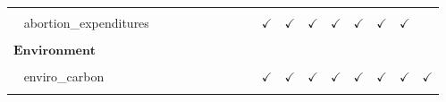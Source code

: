 \documentclass[
  12pt]{article}
\begin{document}
\begin{table}[H]
{\begin{tabular}{lcccccccccccccccc}
\cellcolor{gray!6}{$\hspace{10pt}$abortion\_coverage} & \cellcolor{gray!6}{} & \cellcolor{gray!6}{} & \cellcolor{gray!6}{} & \cellcolor{gray!6}{} & \cellcolor{gray!6}{} & \cellcolor{gray!6}{} & \cellcolor{gray!6}{} & \cellcolor{gray!6}{} & \cellcolor{gray!6}{$\checkmark$} & \cellcolor{gray!6}{$\checkmark$} & \cellcolor{gray!6}{$\checkmark$} & \cellcolor{gray!6}{$\checkmark$} & \cellcolor{gray!6}{$\checkmark$} & \cellcolor{gray!6}{} & \cellcolor{gray!6}{$\checkmark$} & \cellcolor{gray!6}{}\\
$\hspace{10pt}$abortion\_expenditures &  &  &  &  &  &  &  &  & $\checkmark$ & $\checkmark$ & $\checkmark$ & $\checkmark$ & $\checkmark$ & $\checkmark$ & $\checkmark$ & \\
\cellcolor{gray!6}{$\hspace{10pt}$abortion\_prohibition} & \cellcolor{gray!6}{} & \cellcolor{gray!6}{} & \cellcolor{gray!6}{} & \cellcolor{gray!6}{} & \cellcolor{gray!6}{} & \cellcolor{gray!6}{} & \cellcolor{gray!6}{} & \cellcolor{gray!6}{} & \cellcolor{gray!6}{} & \cellcolor{gray!6}{$\checkmark$} & \cellcolor{gray!6}{$\checkmark$} & \cellcolor{gray!6}{$\checkmark$} & \cellcolor{gray!6}{$\checkmark$} & \cellcolor{gray!6}{$\checkmark$} & \cellcolor{gray!6}{$\checkmark$} & \cellcolor{gray!6}{$\checkmark$}\\
$\textbf{Environment}$ &  &  &  &  &  &  &  &  &  &  &  &  &  &  &  & \\
\cellcolor{gray!6}{$\hspace{10pt}$enviro\_scale} & \cellcolor{gray!6}{$\checkmark$} & \cellcolor{gray!6}{$\checkmark$} & \cellcolor{gray!6}{} & \cellcolor{gray!6}{$\checkmark$} & \cellcolor{gray!6}{$\checkmark$} & \cellcolor{gray!6}{$\checkmark$} & \cellcolor{gray!6}{$\checkmark$} & \cellcolor{gray!6}{} & \cellcolor{gray!6}{} & \cellcolor{gray!6}{} & \cellcolor{gray!6}{} & \cellcolor{gray!6}{} & \cellcolor{gray!6}{} & \cellcolor{gray!6}{} & \cellcolor{gray!6}{} & \cellcolor{gray!6}{}\\
$\hspace{10pt}$enviro\_carbon &  &  &  &  &  &  &  &  & $\checkmark$ & $\checkmark$ & $\checkmark$ & $\checkmark$ & $\checkmark$ & $\checkmark$ & $\checkmark$ & $\checkmark$\\
\cellcolor{gray!6}{$\hspace{10pt}$enviro\_mpg\_raise} & \cellcolor{gray!6}{} & \cellcolor{gray!6}{} & \cellcolor{gray!6}{} & \cellcolor{gray!6}{} & \cellcolor{gray!6}{} & \cellcolor{gray!6}{} & \cellcolor{gray!6}{} & \cellcolor{gray!6}{} & \cellcolor{gray!6}{$\checkmark$} & \cellcolor{gray!6}{$\checkmark$} & \cellcolor{gray!6}{$\checkmark$} & \cellcolor{gray!6}{$\checkmark$} & \cellcolor{gray!6}{$\checkmark$} & \cellcolor{gray!6}{} & \cellcolor{gray!6}{$\checkmark$} & \cellcolor{gray!6}{$\checkmark$}\\

\end{tabular}}
\end{table}
\end{document}

